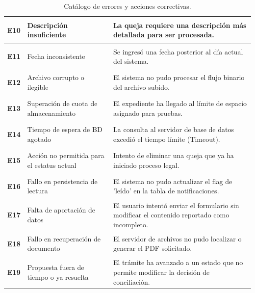 \begin{table}[htbp]
\begin{tabular}{|p{2cm}|p{6cm}|p{6cm}|}
\hypertarget{err:E10}{\textbf{E10}} & Descripción insuficiente & La queja requiere una descripción más detallada para ser procesada. \\ \hline
\hypertarget{err:E11}{\textbf{E11}} & Fecha inconsistente & Se ingresó una fecha posterior al día actual del sistema. \\ \hline
\hypertarget{err:E12}{\textbf{E12}} & Archivo corrupto o ilegible & El sistema no pudo procesar el flujo binario del archivo subido. \\ \hline
\hypertarget{err:E13}{\textbf{E13}} & Superación de cuota de almacenamiento & El expediente ha llegado al límite de espacio asignado para pruebas. \\ \hline
\hypertarget{err:E14}{\textbf{E14}} & Tiempo de espera de BD agotado & La consulta al servidor de base de datos excedió el tiempo límite (Timeout). \\ \hline
\hypertarget{err:E15}{\textbf{E15}} & Acción no permitida para el estatus actual & Intento de eliminar una queja que ya ha iniciado proceso legal. \\ \hline
\hypertarget{err:E16}{\textbf{E16}} & Fallo en persistencia de lectura & El sistema no pudo actualizar el flag de 'leído' en la tabla de notificaciones. \\ \hline
\hypertarget{err:E17}{\textbf{E17}} & Falta de aportación de datos & El usuario intentó enviar el formulario sin modificar el contenido reportado como incompleto. \\ \hline
\hypertarget{err:E18}{\textbf{E18}} & Fallo en recuperación de documento & El servidor de archivos no pudo localizar o generar el PDF solicitado. \\ \hline
\hypertarget{err:E19}{\textbf{E19}} & Propuesta fuera de tiempo o ya resuelta & El trámite ha avanzado a un estado que no permite modificar la decisión de conciliación. \\ \hline





\end{tabular}
\caption{Catálogo de errores y acciones correctivas.}
\end{table}